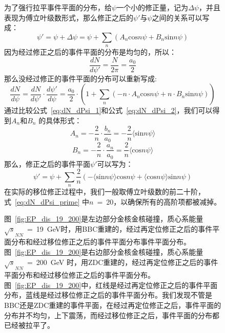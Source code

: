 \begin{figure}[htbp]
\begin{itemize}
为了强行拉平事件平面的分布，给$\psi$一个小的修正量，记为$\Delta\psi$，并且表现为傅立叶级数形式，那么修正之后的$\psi\prime$与$\psi$之间的关系可以写成：
\begin{equation}
\psi\prime = \psi + \Delta\psi = \psi + \sum_{n}(A_{n}\mathrm{cos}n\psi + B_{n}\mathrm{sin}n\psi)
\end{equation}
因为经过修正之后的事件平面的分布是均匀的，所以：
\begin{equation}
\frac{dN}{d\psi\prime} = \frac{N}{2\pi} = \frac{a_{0}}{2}
\end{equation}
那么没经过修正的事件平面的分布可以重新写成:
\begin{equation}
\frac{dN}{d\psi} = \frac{dN}{d\psi\prime} \cdot \frac{d\psi\prime}{d\psi} = \frac{a_{0}}{2} \cdot (1+\sum_{n}(-n \cdot A_{n}\mathrm{cos}n\psi + n \cdot B_{n}\mathrm{sin}n\psi))
\label{eq:dN_dPsi_2}
\end{equation}
通过比较公式~\ref{eq:dN_dPsi_1}和公式~\ref{eq:dN_dPsi_2}，我们可以得到$A_{n}$和$B_{n}$ 的具体形式：
\begin{equation}
A_{n} = -\frac{2}{n} \cdot \frac{b_{n}}{a_{0}} = -\frac{2}{n} \langle \mathrm{sin}n\psi \rangle
\end{equation}
\begin{equation}
B_{n} = -\frac{2}{n} \cdot \frac{a_{n}}{a_{0}} = \frac{2}{n} \langle \mathrm{cos}n\psi \rangle
\end{equation}
那么，修正之后的事件平面$\psi\prime$可以写为：
\begin{equation}
\psi\prime = \psi + \sum_{n} \frac{2}{n}( -\langle \mathrm{sin}n\psi \rangle \mathrm{cos}n\psi + \langle \mathrm{cos}n\psi \rangle \mathrm{sin}n\psi)
\label{eq:dN_dPsi_prime}
\end{equation}
在实际的移位修正过程中，我们一般取傅立叶级数的前二十阶，式~\ref{eq:dN_dPsi_prime} 中$n$~=~20，以确保所有的高阶项都被减掉。
\end{itemize}

图~\ref{fig:EP_dis_19_200}是左边部分金核金核碰撞，质心系能量$\sqrt{s}_{NN}$~=~19~GeV时，用BBC重建的，经过再定位修正之后的事件平面分布和经过移位修正之后的事件平面分布事件平面分布。图~\ref{fig:EP_dis_19_200}是右边部分金核金核碰撞，质心系能量$\sqrt{s}_{NN}$~=~200~GeV 时，用ZDC重建的，经过再定位修正之后的事件平面分布和经过移位修正之后的事件平面分布。图~\ref{fig:EP_dis_19_200}中，红线是经过再定位修正之后的事件平面分布，蓝线是经过移位修正之后的事件平面分布。我们发现不管是BBC还是ZDC重建的事件平面，在经过再定位修正之后，事件平面的分布并不均匀，上下震荡，而经过移位修正之后，事件平面的分布都已经被拉平了。


\end{figure}
